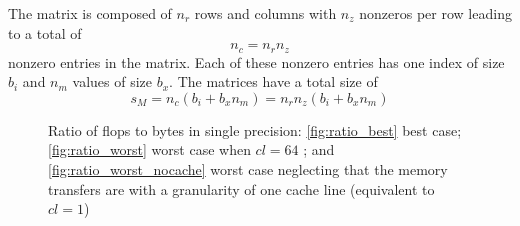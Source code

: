 \documentclass[10pt,conference,compsocconf]{IEEEtran}
\begin{document}
The matrix is composed of $n_r$ rows and columns with $n_z$ nonzeros
per row leading to a total of $$n_c = n_r n_z$$ nonzero entries in
the matrix. Each of these nonzero entries has one index of size $b_i$
and $n_m$ values of size $b_x$. The matrices have a total size
of $$s_M = n_c (b_i + b_x n_m) = n_r n_z (b_i + b_x n_m)$$

\begin{figure}[tbh]
  \centering
  
  \caption{Ratio of flops to bytes in single precision:  
    \ref{fig:ratio_best} best case; \ref{fig:ratio_worst} worst case when $cl=64$ 
    ; and \ref{fig:ratio_worst_nocache} worst case neglecting that the
    memory transfers are with a granularity of one cache line (equivalent to $cl = 1$)}
  \label{fig:ratio_bytes_flops}
\end{figure}
\end{document}
